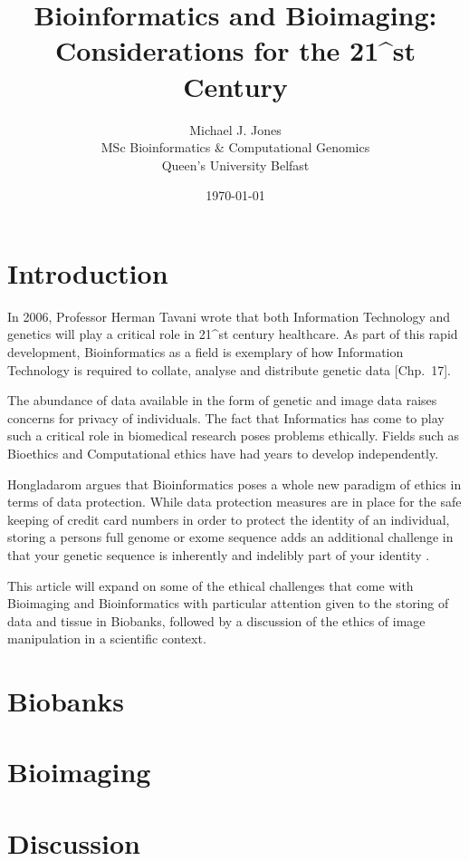 \documentclass[a4paper, 12pt]{article}
\title{Bioinformatics and Bioimaging: Considerations for the 21^{st} Century}
\author{Michael J. Jones \\
  MSc Bioinformatics \& Computational Genomics \\
  Queen's University Belfast}
\date{\today}
\begin{document}
\section{Introduction}
In 2006, Professor Herman Tavani wrote that both Information Technology and
genetics will play a critical role in 21^{st} century healthcare. As part of
this rapid development, Bioinformatics as a field is exemplary of how
Information Technology is required to collate, analyse and distribute genetic
data \cite{tavani2006ethics}[Chp.~17].

The abundance of data available in the form of genetic and image data raises
concerns for privacy of individuals. The fact that Informatics has come to
play such a critical role in biomedical research poses problems ethically.
Fields such as Bioethics and Computational ethics have had years to develop
independently.

Hongladarom argues that Bioinformatics poses a whole new paradigm of ethics in
terms of data protection. While data protection measures are in place for the
safe keeping of credit card numbers in order to protect the identity of an
individual, storing a persons full genome or exome sequence adds an additional
challenge in that your genetic sequence is inherently and indelibly part of
your identity \cite{hongladarom2006ethics}.

This article will expand on some of the ethical challenges that come with
Bioimaging and Bioinformatics with particular attention given to the storing
of data and tissue in Biobanks, followed by a discussion of the ethics of
image manipulation in a scientific context.

\section{Biobanks}

\section{Bioimaging}

\section{Discussion}

\printbibliography
\end{document}
